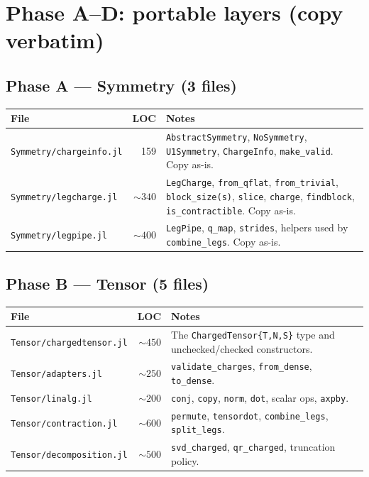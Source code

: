 \documentclass[11pt]{article}
\begin{document}
\section{Phase A--D: portable layers (copy verbatim)}

\subsection{Phase A --- Symmetry (3 files)}
\begin{center}
\begin{tabularx}{\linewidth}{l r X}
\toprule
File & LOC & Notes \\
\midrule
\texttt{Symmetry/chargeinfo.jl} & 159 & \texttt{AbstractSymmetry}, \texttt{NoSymmetry}, \texttt{U1Symmetry}, \texttt{ChargeInfo}, \texttt{make\_valid}.  Copy as-is. \\
\texttt{Symmetry/legcharge.jl}  & $\sim 340$ & \texttt{LegCharge}, \texttt{from\_qflat}, \texttt{from\_trivial}, \texttt{block\_size(s)}, \texttt{slice}, \texttt{charge}, \texttt{findblock}, \texttt{is\_contractible}.  Copy as-is. \\
\texttt{Symmetry/legpipe.jl}    & $\sim 400$ & \texttt{LegPipe}, \texttt{q\_map}, \texttt{strides}, helpers used by \texttt{combine\_legs}.  Copy as-is. \\
\bottomrule
\end{tabularx}
\end{center}

\subsection{Phase B --- Tensor (5 files)}
\begin{center}
\begin{tabularx}{\linewidth}{l r X}
\toprule
File & LOC & Notes \\
\midrule
\texttt{Tensor/chargedtensor.jl}  & $\sim 450$ & The \texttt{ChargedTensor\{T,N,S\}} type and unchecked/checked constructors. \\
\texttt{Tensor/adapters.jl}       & $\sim 250$ & \texttt{validate\_charges}, \texttt{from\_dense}, \texttt{to\_dense}. \\
\texttt{Tensor/linalg.jl}         & $\sim 200$ & \texttt{conj}, \texttt{copy}, \texttt{norm}, \texttt{dot}, scalar ops, \texttt{axpby}. \\
\texttt{Tensor/contraction.jl}    & $\sim 600$ & \texttt{permute}, \texttt{tensordot}, \texttt{combine\_legs}, \texttt{split\_legs}. \\
\texttt{Tensor/decomposition.jl}  & $\sim 500$ & \texttt{svd\_charged}, \texttt{qr\_charged}, truncation policy. \\
\bottomrule
\end{tabularx}
\end{center}
\end{document}
